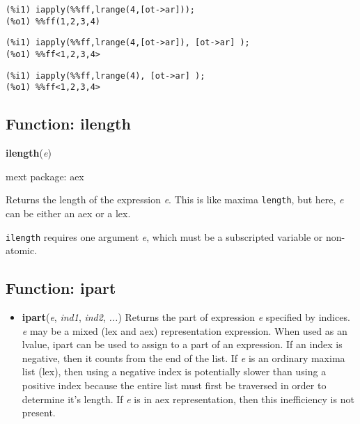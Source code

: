 \documentclass[]{article}
\begin{document}
\begin{Verbatim}[frame=single]
(%i1) iapply(%%ff,lrange(4,[ot->ar]));
(%o1) %%ff(1,2,3,4)
\end{Verbatim}

\begin{Verbatim}[frame=single]
(%i1) iapply(%%ff,lrange(4,[ot->ar]), [ot->ar] );
(%o1) %%ff<1,2,3,4>
\end{Verbatim}

\begin{Verbatim}[frame=single]
(%i1) iapply(%%ff,lrange(4), [ot->ar] );
(%o1) %%ff<1,2,3,4>
\end{Verbatim}


\subsection{Function: ilength\label{sec:ilength}}
\hypertarget{ilength}{}
{\bf ilength}({\it e})


\noindent mext package: aex



\vspace{5 pt}
Returns the length of the expression {\it e}. This is like maxima \verb#length#, but here, {\it e} can be either an aex or a lex. 

\vspace{5 pt}

   {\tt ilength} requires one argument {\it e}, which must be a subscripted variable or non-atomic.


\vspace{5 pt}


\subsection{Function: ipart\label{sec:ipart}}
\hypertarget{ipart}{}



\vspace{5 pt}
\begin{itemize}
\item[] {\bf ipart}({\it e}, {\it ind1}, {\it ind2}, {\it ...})
  Returns the part of expression {\it e} specified by indices. {\it e} may be a mixed (lex and aex) representation expression. When used as an lvalue, ipart can be used to assign to a part of an expression. If an index is negative, then it counts from the end of the list. If {\it e} is an ordinary 
maxima list (lex), then using a negative index is potentially slower than using a positive index because the entire list must first be traversed in order to determine it's length. If {\it e} is in aex representation, then this inefficiency is not present. 

\end{itemize}
\end{document}
